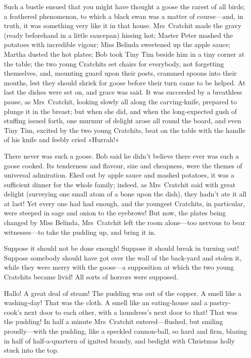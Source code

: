Such a bustle ensued that you might have thought a goose the rarest of all birds; a feathered phenomenon, to which a black swan was a matter of course---and, in truth, it was something very like it in that house. Mrs~Cratchit made the gravy (ready beforehand in a little saucepan) hissing hot; Master Peter mashed the potatoes with incredible vigour; Miss Belinda sweetened up the apple sauce; Martha dusted the hot plates; Bob took Tiny Tim beside him in a tiny corner at the table; the two young Cratchits set chairs for everybody, not forgetting themselves, and, mounting guard upon their posts, crammed spoons into their mouths, lest they should shriek for goose before their turn came to be helped. At last the dishes were set on, and grace was said. It was succeeded by a breathless pause, as Mrs~Cratchit, looking slowly all along the carving-knife, prepared to plunge it in the breast; but when she did, and when the long-expected gush of stuffing issued forth, one murmur of delight arose all round the board, and even Tiny Tim, excited by the two young Cratchits, beat on the table with the handle of his knife and feebly cried »Hurrah!«



There never was such a goose. Bob said he didn't believe there ever was such a goose cooked. Its tenderness and flavour, size and cheapness, were the themes of universal admiration. Eked out by apple sauce and mashed potatoes, it was a sufficient dinner for the whole family; indeed, as Mrs~Cratchit said with great delight (surveying one small atom of a bone upon the dish), they hadn't ate it all at last! Yet every one had had enough, and the youngest Cratchits, in particular, were steeped in sage and onion to the eyebrows! But now, the plates being changed by Miss Belinda, Mrs~Cratchit left the room alone---too nervous to bear witnesses---to take the pudding up, and bring it in.



Suppose it should not be done enough! Suppose it should break in turning out! Suppose somebody should have got over the wall of the back-yard and stolen it, while they were merry with the goose---a supposition at which the two young Cratchits became livid! All sorts of horrors were supposed.

Hallo! A great deal of steam! The pudding was out of the copper. A smell like a washing-day! That was the cloth. A smell like an eating-house and a pastry-cook's next door to each other, with a laundress's next door to that! That was the pudding! In half a minute Mrs~Cratchit entered---flushed, but smiling proudly---with the pudding, like a speckled cannon-ball, so hard and firm, blazing in half of half-a-quartern of ignited brandy, and bedight with Christmas holly stuck into the top.


